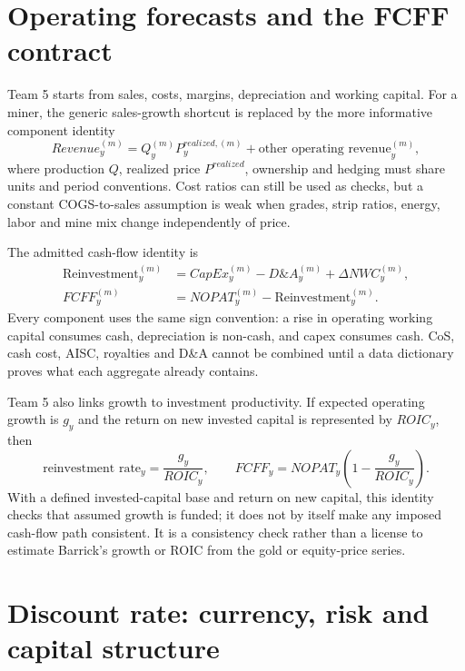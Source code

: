 \section{Operating forecasts and the FCFF contract}

Team 5 starts from sales, costs, margins, depreciation and working capital.
For a miner, the generic sales-growth shortcut is replaced by the more
informative component identity
\begin{equation}
Revenue_y^{(m)}=Q_y^{(m)}P_y^{realized,(m)}+\text{other operating revenue}_y^{(m)},
\end{equation}
where production \(Q\), realized price \(P^{realized}\), ownership and hedging
must share units and period conventions. Cost ratios can still be used as
checks, but a constant COGS-to-sales assumption is weak when grades, strip
ratios, energy, labor and mine mix change independently of price.

The admitted cash-flow identity is
\begin{align}
\text{Reinvestment}_y^{(m)}
  &=CapEx_y^{(m)}-D\&A_y^{(m)}+\Delta NWC_y^{(m)},\\
FCFF_y^{(m)}
  &=NOPAT_y^{(m)}-\text{Reinvestment}_y^{(m)}.
\end{align}
Every component uses the same sign convention: a rise in operating working
capital consumes cash, depreciation is non-cash, and capex consumes cash. CoS,
cash cost, AISC, royalties and D\&A cannot be combined until a data dictionary
proves what each aggregate already contains.

Team 5 also links growth to investment productivity. If expected operating
growth is \(g_y\) and the return on new invested capital is represented by
\(ROIC_y\), then
\begin{equation}
\text{reinvestment rate}_y=\frac{g_y}{ROIC_y},
\qquad
FCFF_y=NOPAT_y\left(1-\frac{g_y}{ROIC_y}\right).
\end{equation}
With a defined invested-capital base and return on new capital, this identity
checks that assumed growth is funded; it does not by itself make any imposed
cash-flow path consistent. It is a consistency check rather than a license to estimate Barrick's growth or
ROIC from the gold or equity-price series.

\section{Discount rate: currency, risk and capital structure}

